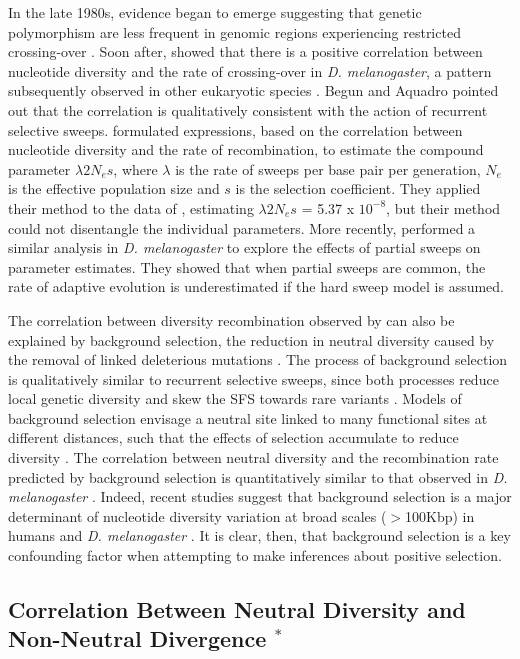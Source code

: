In the late 1980s, evidence began to emerge suggesting that genetic polymorphism are less frequent in genomic regions experiencing restricted crossing-over \citep{RN225,RN282}. Soon after, \cite{RN114} showed that there is a positive correlation between nucleotide diversity and the rate of crossing-over in \emph{D. melanogaster}, a pattern subsequently observed in other eukaryotic species \citep{RN117}. Begun and Aquadro pointed out that the correlation is qualitatively consistent with the action of recurrent selective sweeps. \cite{RN277} formulated expressions, based on the correlation between nucleotide diversity and the rate of recombination, to estimate the compound parameter $\lambda 2N_{e}s$, where $\lambda$ is the rate of sweeps per base pair per generation, $N_e$ is the effective population size and $s$ is the selection coefficient. They applied their method to the data of \cite{RN114}, estimating $\lambda2N_{e}s$ = 5.37 x $10^{-8}$, but their method could not disentangle the individual parameters. More recently, \cite{RN226} performed a similar analysis in \emph{D. melanogaster} to explore the effects of partial sweeps on parameter estimates. They showed that when partial sweeps are common, the rate of adaptive evolution is underestimated if the hard sweep model is assumed.
 
The correlation between diversity recombination observed by \cite{RN114} can also be explained by background selection, the reduction in neutral diversity caused by the removal of linked deleterious mutations \citep{RN132}. The process of background selection is qualitatively similar to recurrent selective sweeps, since both processes reduce local genetic diversity \citep{RN110} and skew the SFS towards rare variants \citep{RN287,RN133}. Models of background selection envisage a neutral site linked to many functional sites at different distances, such that the effects of selection accumulate to reduce diversity \citep{RN206, RN157}. The correlation between neutral diversity and the recombination rate predicted by background selection is quantitatively similar to that observed in \emph{D. melanogaster} \citep{RN281}. Indeed, recent studies suggest that background selection is a major determinant of nucleotide diversity variation at broad scales ($>$100Kbp) in humans \cite{RN120} and \emph{D. melanogaster} \citep{RN288, RN116}. It is clear, then, that background selection is a key confounding factor when attempting to make inferences about positive selection.
 
\subsection[Correlations between neutral diversity and non-neutral divergence]{Correlation Between Neutral Diversity and Non-Neutral Divergence $^*$}

